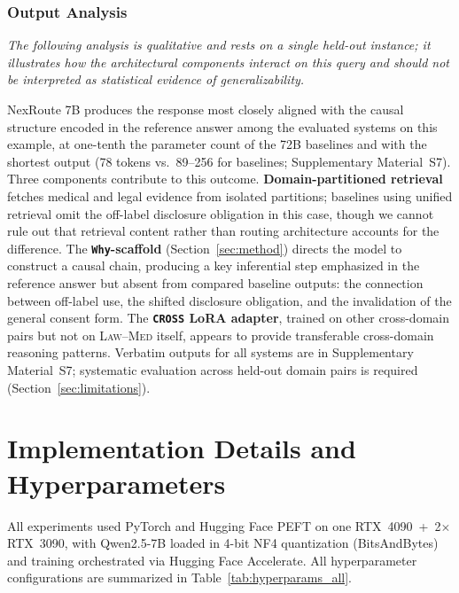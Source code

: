 \documentclass[a4paper,fleql,doubleblind]{cas-sc}
\begin{document}
\subsubsection{Output Analysis}
\label{sssec:nexroute-advantages}
\emph{The following analysis is qualitative and rests on a single held-out instance;
it illustrates how the architectural components interact on this query and
should not be interpreted as statistical evidence of generalizability.}

NexRoute 7B produces the response most closely aligned with the causal structure
encoded in the reference answer among the evaluated systems on this example,
at one-tenth the parameter count of the 72B baselines and with the shortest output
(78 tokens vs.\ 89--256 for baselines; Supplementary Material~S7).
Three components contribute to this outcome.
\textbf{Domain-partitioned retrieval} fetches medical and legal evidence from
isolated partitions; baselines using unified retrieval omit the off-label
disclosure obligation in this case, though we cannot rule out that retrieval
content rather than routing architecture accounts for the difference.
The \textbf{\texttt{Why}-scaffold} (Section~\ref{sec:method}) directs the model
to construct a causal chain, producing a key inferential step emphasized in the
reference answer but absent from compared baseline outputs: the connection between
off-label use, the shifted disclosure obligation, and the invalidation of the
general consent form.
The \textbf{\texttt{CROSS} LoRA adapter}, trained on other cross-domain pairs
but not on \textsc{Law}--\textsc{Med} itself, appears to provide transferable
cross-domain reasoning patterns.
Verbatim outputs for all systems are in Supplementary Material~S7;
systematic evaluation across held-out domain pairs is required
(Section~\ref{sec:limitations}).

\section{Implementation Details and Hyperparameters}
\label{sec:implementation}
All experiments used PyTorch and Hugging Face PEFT on one RTX~4090\ +\ 2$\times$RTX~3090, with Qwen2.5-7B loaded in 4-bit NF4 quantization (BitsAndBytes) and training orchestrated via Hugging Face Accelerate. All hyperparameter configurations are summarized in Table~\ref{tab:hyperparams_all}.
\end{document}
